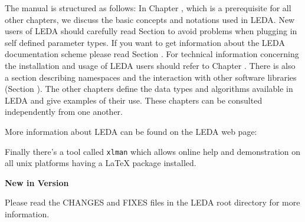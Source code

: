 The manual is structured as follows: In Chapter 
, which is a
prerequisite for all other chapters, we discuss the basic concepts and
notations used in LEDA. New users of LEDA should carefully read Section
 to avoid problems when plugging in self
defined parameter types. If you want to get information about the LEDA
documentation scheme please read Section . 
For technical
information concerning the installation and usage of LEDA 
users should refer to Chapter
. There is also a section describing 
namespaces and the interaction with other software
libraries (Section ).  The other chapters define the data types and algorithms available
in LEDA and give examples of their use. These chapters can be consulted
independently from one another.

More information about LEDA can be found on the LEDA web page:\\

Finally there's a tool called \verb|xlman| which allows online help and
demonstration on all unix platforms having a \LaTeX{} package installed.

\bigskip
{\large\bf New in Version \ledaversion}

Please read the CHANGES and FIXES files in the LEDA root directory for more 
information.
